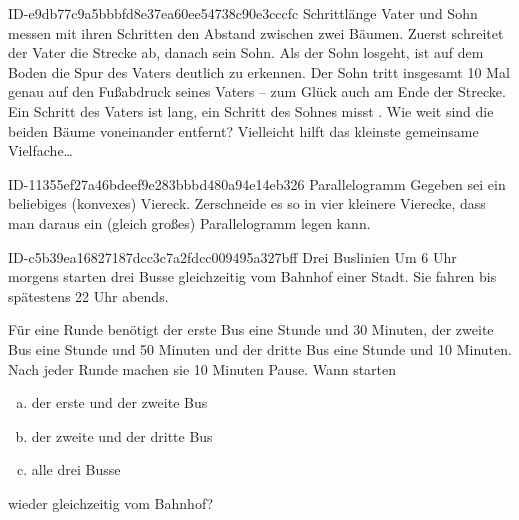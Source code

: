 \begin{exercise}
      {ID-e9db77c9a5bbbfd8e37ea60ee54738c90e3cccfc}
      {Schrittlänge}
  \ifproblem\problem
    Vater und Sohn messen mit ihren Schritten den Abstand zwischen zwei Bäumen.
    Zuerst schreitet der Vater die Strecke ab, danach sein Sohn. Als der Sohn
    losgeht, ist auf dem Boden die Spur des Vaters deutlich zu erkennen.
    Der Sohn tritt insgesamt 10 Mal genau auf den Fußabdruck seines Vaters --
    zum Glück auch am Ende der Strecke. Ein Schritt des Vaters ist 
    lang, ein Schritt des Sohnes misst . Wie weit sind die beiden
    Bäume voneinander entfernt?
  \fi
  \ifoutline\outline
    Vielleicht hilft das kleinste gemeinsame Vielfache\ldots
  \fi
\end{exercise}

\begin{exercise}
      {ID-11355ef27a46bdeef9e283bbbd480a94e14eb326}
      {Parallelogramm}
  \ifproblem\problem
    Gegeben sei ein beliebiges (konvexes) Viereck. Zerschneide es so in vier
    kleinere Vierecke, dass man daraus ein (gleich großes) Parallelogramm legen
    kann.
  \fi
\end{exercise}

\begin{exercise}
      {ID-c5b39ea16827187dcc3c7a2fdcc009495a327bff}
      {Drei Buslinien}
  \ifproblem\problem
    Um 6 Uhr morgens starten drei Busse gleichzeitig vom Bahnhof einer Stadt.
    Sie fahren bis spätestens 22 Uhr abends.\par
    Für eine Runde benötigt
    der erste Bus eine Stunde und 30 Minuten,
    der zweite Bus eine Stunde und 50 Minuten und
    der dritte Bus eine Stunde und 10 Minuten.
    Nach jeder Runde machen sie 10 Minuten Pause.
    Wann starten
    \begin{enumerate}[a)]
      \item der erste und der zweite Bus
      \item der zweite und der dritte Bus
      \item alle drei Busse
    \end{enumerate}
    wieder gleichzeitig vom Bahnhof?
  \fi
\end{exercise}

